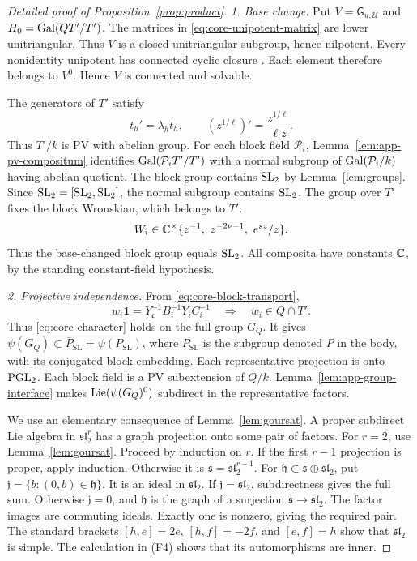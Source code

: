 \begin{proof}[Detailed proof of Proposition~\ref{prop:product}]
\emph{1. Base change.}
Put $V=\mathsf G_{u,\mathcal U}$ and $H_0=\operatorname{Gal}(QT'/T')$.
The matrices in \eqref{eq:core-unipotent-matrix} are lower unitriangular.
Thus $V$ is a closed unitriangular subgroup, hence nilpotent.
Every nonidentity unipotent has connected cyclic closure
\cite[\S2.1, p.~56; \S7.3, Remark, p.~106]{Borel1991}.
Each element therefore belongs to $V^0$.
Hence $V$ is connected and solvable.

The generators of $T'$ satisfy
\[
 t_h'=\lambda_ht_h,\qquad
 (z^{1/\ell})'=\frac{z^{1/\ell}}{\ell z}.
\]
Thus $T'/k$ is PV with abelian group.
For each block field $\mathcal P_i$, Lemma~\ref{lem:app-pv-compositum}
identifies $\operatorname{Gal}(\mathcal P_iT'/T')$ with a normal subgroup of
$\operatorname{Gal}(\mathcal P_i/k)$ having abelian quotient.
The block group contains $\operatorname{SL}_2$ by Lemma~\ref{lem:groups}.
Since $\operatorname{SL}_2=[\operatorname{SL}_2,\operatorname{SL}_2]$, the normal subgroup contains $\operatorname{SL}_2$.
The group over $T'$ fixes the block Wronskian, which belongs to $T'$:
\[
 W_i\in\C^\times\{z^{-1},\ z^{-2\nu-1},\ e^{sz}/z\}.
\]
Thus the base-changed block group equals $\operatorname{SL}_2$.
All composita have constants $\mathbb{C}$, by the standing constant-field hypothesis.

\emph{2. Projective independence.}
From \eqref{eq:core-block-transport},
\[
 w_i\mathbf1=Y_{\mathfrak c}^{-1}B_i^{-1}Y_iC_i^{-1}
 \quad\Longrightarrow\quad w_i\in Q\cap T'.
\]
Thus \eqref{eq:core-character} holds on the full group $G_Q$.
It gives $\psi(G_Q)\subset\bar P_{\mathrm{SL}}=\psi(P_{\mathrm{SL}})$,
where $P_{\mathrm{SL}}$ is the subgroup denoted $P$ in the body, with its conjugated block embedding.
Each representative projection is onto $\operatorname{PGL}_2$.
Each block field is a PV subextension of $Q/k$.
Lemma~\ref{lem:app-group-interface} makes
$\operatorname{Lie}(\psi(G_Q)^0)$ subdirect in the representative factors.

We use an elementary consequence of Lemma~\ref{lem:goursat}.
A proper subdirect Lie algebra in $\mathfrak{sl}_2^r$ has a graph projection
onto some pair of factors.
For $r=2$, use Lemma~\ref{lem:goursat}.
Proceed by induction on $r$.
If the first $r-1$ projection is proper, apply induction.
Otherwise it is $\mathfrak s=\mathfrak{sl}_2^{r-1}$.
For $\mathfrak h\subset\mathfrak s\oplus\mathfrak{sl}_2$, put
$\mathfrak j=\{b:(0,b)\in\mathfrak h\}$.
It is an ideal in $\mathfrak{sl}_2$.
If $\mathfrak j=\mathfrak{sl}_2$, subdirectness gives the full sum.
Otherwise $\mathfrak j=0$, and $\mathfrak h$ is the graph of a surjection
$\mathfrak s\to\mathfrak{sl}_2$.
The factor images are commuting ideals.
Exactly one is nonzero, giving the required pair.
The standard brackets $[h,e]=2e$, $[h,f]=-2f$, and $[e,f]=h$
show that $\mathfrak{sl}_2$ is simple.
The calculation in (F4) shows that its automorphisms are inner.


\end{proof}
